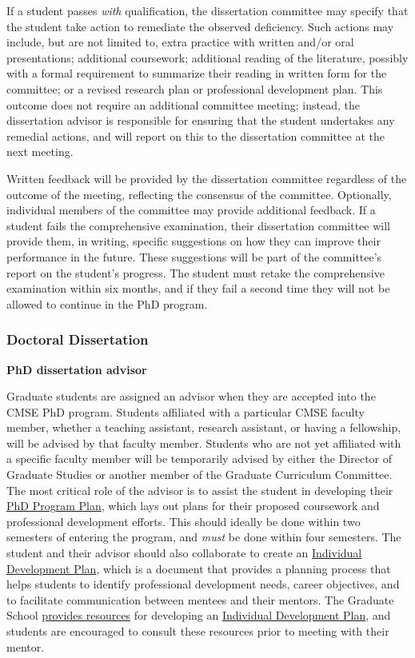 If a student passes \textit{with} qualification, the dissertation committee
may specify that the student take action to remediate the observed
deficiency.  Such actions may include, but are not limited to, extra
practice with written and/or oral presentations; additional
coursework; additional reading of the literature, possibly with a
formal requirement to summarize their reading in written form for the
committee; or a revised research plan or professional development
plan.  This outcome does not require an additional committee meeting;
instead, the dissertation advisor is responsible for ensuring that the
student undertakes any remedial actions, and will report on this to
the dissertation committee at the next meeting.

Written feedback will be provided by the dissertation committee
regardless of the outcome of the meeting, reflecting the consensus of
the committee.  Optionally, individual members of the committee may
provide additional feedback.
If a student fails the comprehensive examination, their dissertation
committee will provide them, in writing, specific suggestions on
how they can improve their performance in the future.  These
suggestions will be part of the committee's report on the student's
progress.  The student must retake
the comprehensive examination within six months, and if they fail a
second time they will not be allowed to continue in the PhD program.


\vspace{3mm}
\subsubsection{Doctoral Dissertation}
\label{sec:phd_dissertation}

\vspace{3mm}
\noindent
\textbf{PhD dissertation advisor}

Graduate students are assigned an advisor when they are accepted into
the CMSE PhD program.  Students affiliated with a particular CMSE
faculty member, whether a teaching assistant, research assistant, or
having a fellowship, will be advised by that faculty member.  Students
who are not yet affiliated with a specific faculty member will be
temporarily advised by either the Director of Graduate Studies or
another member of the Graduate Curriculum Committee.  The most
critical role of the advisor is to assist the student in developing
their \href{https://login.msu.edu/?App=J3205}{PhD Program Plan}, which
lays out plans for their proposed coursework and professional
development efforts.  This should ideally be done within two semesters
of entering the program, and \textit{must} be done within four
semesters.  The student and their advisor should also collaborate  to create an
\href{http://caffe.grd.msu.edu/IDP}{Individual Development Plan},
which is a document that provides a planning process that helps
students to identify professional development needs, career
objectives, and to facilitate communication between mentees and their
mentors.  The Graduate School
\href{https://grad.msu.edu/prep}{provides resources} for developing an
\href{http://caffe.grd.msu.edu/IDP}{Individual Development Plan}, and
students are encouraged to consult these resources prior to meeting
with their mentor.

